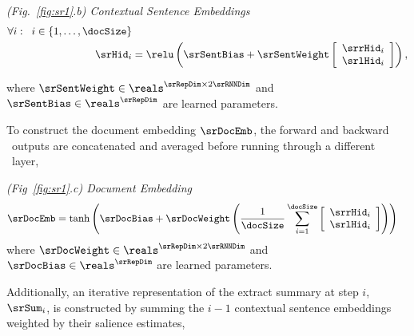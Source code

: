 \vspace{10pt}
\noindent \textit{(Fig.~\ref{fig:sr1}.b) Contextual Sentence Embeddings} 
\begin{align}
    \forall i : \;\; i \in \{1,\ldots,\docSize\}&\nonumber \\
\srHid_i  & = \relu\left(\srSentBias + \srSentWeight \left[ \begin{array}{c} \srrHid_i \\ \srlHid_i  \end{array} \right]  \right),
\end{align}

where $\srSentWeight \in \reals^{\srRepDim \times 2\srRNNDim}$ and $\srSentBias \in \reals^{\srRepDim}$ are learned parameters.

To construct the document embedding $\srDocEmb$, the forward and backward 
\gru~outputs are concatenated and averaged before running through a different 
\feedforward~layer,

\vspace{10pt}
\noindent\textit{(Fig~\ref{fig:sr1}.c) Document Embedding}
\begin{align}
\srDocEmb  & = \tanh\left(\srDocBias + \srDocWeight \left(\frac{1}{\docSize}\sum_{i=1}^{\docSize} \left[ \begin{array}{c} \srrHid_i \\ \srlHid_i  \end{array} \right] \right) \right)
\end{align}
where $\srDocWeight \in \reals^{\srRepDim \times 2\srRNNDim}$ and $\srDocBias \in \reals^{\srRepDim}$ are learned parameters.

%





Additionally, an iterative representation of the extract summary at step $i$,
 $\srSum_i$, is constructed by summing the $i-1$ contextual sentence 
embeddings weighted by their salience estimates,

